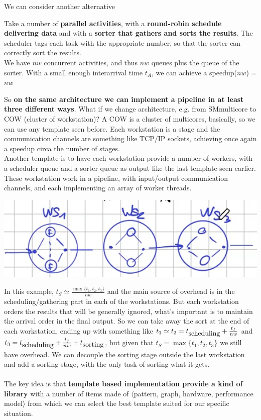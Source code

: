 \documentclass[10pt]{report}
\begin{document}
We can consider another alternative
\begin{list}{}{}
	\item Take a number of \textbf{parallel activities}, with a \textbf{round-robin schedule delivering data} and with a \textbf{sorter that gathers and sorts the results}. The scheduler tags each task with the appropriate number, so that the sorter can correctly sort the results.\\
	We have $nw$ concurrent activities, and thus $nw$ queues plus the queue of the sorter. With a small enough interarrival time $t_A$, we can achieve a speedup($nw$) = $nw$
\end{list}
So \textbf{on the same architecture we can implement a pipeline in at least three different ways}. What if we change architecture, e.g. from SMmulticore to COW (cluster of workstation)? A COW is a cluster of multicores, basically, so we can use any template seen before. Each workstation is a stage and the communication channels are something like TCP/IP sockets, achieving once again a speedup circa the number of stages.\\
Another template is to have each workstation provide a number of workers, with a scheduler queue and a sorter queue as output like the last template seen earlier. These workstation work in a pipeline, with input/output communication channels, and each implementing an array of worker threads.
\begin{center}
	\includegraphics[scale=0.5]{27.png}
\end{center}
In this example, $t_S\simeq\frac{\max\{t_1,t_2,t_3\}}{nw}$ and the main source of overhead is in the scheduling/gathering part in each of the workstations. But each workstation orders the results that will be generally ignored, what's important is to maintain the arrival order in the final output. So we can take away the sort at the end of each workstation, ending up with something like $t_1\simeq t_2 = t_{\hbox{scheduling}} + \frac{t_f}{nw}$ and $t_3 = t_{\hbox{scheduling}} + \frac{t_f}{nw} + t_{\hbox{sorting}}$, but given that $t_S=\max\{t_1, t_2, t_3\}$ we still have overhead. We can decouple the sorting stage outside the last workstation and add a sorting stage, with the only task of sorting what it gets.\\\\
The key idea is that \textbf{template based implementation provide a kind of library} with a number of items made of $\langle$pattern, graph, hardware, performance model$\rangle$ from which we can select the best template suited for our specific situation.
\end{document}
